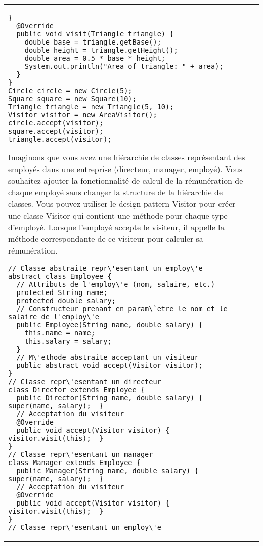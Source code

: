 \begin{table}[H]
\begin{adjustbox}{max width=\textwidth}
\begin{tabular}{l|p{\textwidth}}
\begin{minipage}[tl]{0.5\textwidth}
\begin{lstlisting}[style=monstyle]
  }
  @Override
  public void visit(Triangle triangle) {
    double base = triangle.getBase();
    double height = triangle.getHeight();
    double area = 0.5 * base * height;
    System.out.println("Area of triangle: " + area);
  }
}
Circle circle = new Circle(5);
Square square = new Square(10);
Triangle triangle = new Triangle(5, 10);
Visitor visitor = new AreaVisitor();
circle.accept(visitor);
square.accept(visitor);
triangle.accept(visitor);
\end{lstlisting}
\end{minipage}
\hspace{6mm}
\begin{minipage}[tr]{0.5\textwidth}
Imaginons que vous avez une hiérarchie de classes représentant des employés dans une entreprise (directeur, manager, employé). Vous souhaitez ajouter la fonctionnalité de calcul de la rémunération de chaque employé sans changer la structure de la hiérarchie de classes. Vous pouvez utiliser le design pattern Visitor pour créer une classe Visitor qui contient une méthode pour chaque type d'employé. Lorsque l'employé accepte le visiteur, il appelle la méthode correspondante de ce visiteur pour calculer sa rémunération.  
\begin{lstlisting}[style=monstyle]
// Classe abstraite repr\'esentant un employ\'e
abstract class Employee {
  // Attributs de l'employ\'e (nom, salaire, etc.)
  protected String name;
  protected double salary;
  // Constructeur prenant en param\`etre le nom et le salaire de l'employ\'e
  public Employee(String name, double salary) {
    this.name = name;
    this.salary = salary;
  }
  // M\'ethode abstraite acceptant un visiteur
  public abstract void accept(Visitor visitor);
}
// Classe repr\'esentant un directeur
class Director extends Employee {
  public Director(String name, double salary) { super(name, salary);  }
  // Acceptation du visiteur
  @Override
  public void accept(Visitor visitor) { visitor.visit(this);  }
}
// Classe repr\'esentant un manager
class Manager extends Employee {
  public Manager(String name, double salary) { super(name, salary);  }
  // Acceptation du visiteur
  @Override
  public void accept(Visitor visitor) { visitor.visit(this);  }
}
// Classe repr\'esentant un employ\'e

\end{lstlisting}
\end{minipage}
\end{tabular}
\end{adjustbox}
\end{table}
